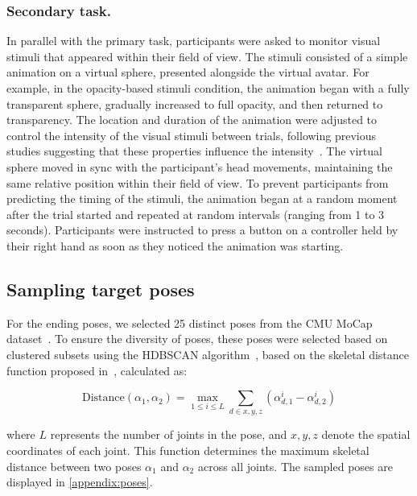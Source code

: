 \subsubsection{Secondary task.}
In parallel with the primary task, participants were asked to monitor visual stimuli that appeared within their field of view. 
The stimuli consisted of a simple animation on a virtual sphere, presented alongside the virtual avatar. 
For example, in the opacity-based stimuli condition, the animation began with a fully transparent sphere, gradually increased to full opacity, and then returned to transparency.
The location and duration of the animation were adjusted to control the intensity of the visual stimuli between trials, following previous studies suggesting that these properties influence the intensity~\cite{li2024predicting}. 
The virtual sphere moved in sync with the participant's head movements, maintaining the same relative position within their field of view.
To prevent participants from predicting the timing of the stimuli, the animation began at a random moment after the trial started and repeated at random intervals (ranging from 1 to 3 seconds). 
Participants were instructed to press a button on a controller held by their right hand as soon as they noticed the animation was starting.

\subsection{Sampling target poses}
\label{section:target_poses}
For the ending poses, we selected 25 distinct poses from the CMU MoCap dataset~\cite{CMUMocap}. 
To ensure the diversity of poses, these poses were selected based on clustered subsets using the HDBSCAN algorithm~\cite{leland2017hdbscan}, based on the skeletal distance function proposed in~\cite{shakhnarovich05learning}, calculated as:

\begin{equation}
    \text{Distance}(\alpha_1, \alpha_2) = \max \limits_{1 \leq i \leq L} \sum_{d \in x, y, z} (\alpha^{i}_{d, 1} - \alpha^{i}_{d, 2})
\end{equation}

where $L$ represents the number of joints in the pose, and $x, y, z$ denote the spatial coordinates of each joint. 
This function determines the maximum skeletal distance between two poses $\alpha_{1}$ and $\alpha_{2}$ across all joints.
The sampled poses are displayed in \autoref{appendix:poses}.

